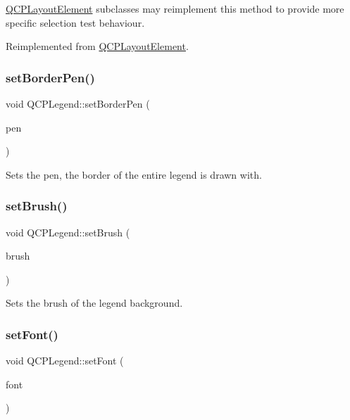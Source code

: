 \mbox{\hyperlink{class_q_c_p_layout_element}{Q\+C\+P\+Layout\+Element}} subclasses may reimplement this method to provide more specific selection test behaviour. 

Reimplemented from \mbox{\hyperlink{class_q_c_p_layout_element_a0b96ae0d7bcfa6e38188fcb1e73e143f}{Q\+C\+P\+Layout\+Element}}.

\mbox{\label{class_q_c_p_legend_a866a9e3f5267de7430a6c7f26a61db9f}} 
\subsubsection{\texorpdfstring{set\+Border\+Pen()}{setBorderPen()}}
{\footnotesize\ttfamily void Q\+C\+P\+Legend\+::set\+Border\+Pen (\begin{DoxyParamCaption}\item[{const Q\+Pen \&}]{pen }\end{DoxyParamCaption})}

Sets the pen, the border of the entire legend is drawn with. \mbox{\label{class_q_c_p_legend_a497bbcd38baa3598c08e2b3f48103f23}} 
\subsubsection{\texorpdfstring{set\+Brush()}{setBrush()}}
{\footnotesize\ttfamily void Q\+C\+P\+Legend\+::set\+Brush (\begin{DoxyParamCaption}\item[{const Q\+Brush \&}]{brush }\end{DoxyParamCaption})}

Sets the brush of the legend background. \mbox{\label{class_q_c_p_legend_aa4cda8499e3cb0f3be415edc02984c73}} 
\subsubsection{\texorpdfstring{set\+Font()}{setFont()}}
{\footnotesize\ttfamily void Q\+C\+P\+Legend\+::set\+Font (\begin{DoxyParamCaption}\item[{const Q\+Font \&}]{font }\end{DoxyParamCaption})}

